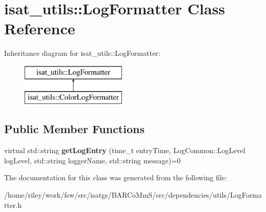 \hypertarget{classisat__utils_1_1_log_formatter}{}\section{isat\+\_\+utils\+:\+:Log\+Formatter Class Reference}
\label{classisat__utils_1_1_log_formatter}
Inheritance diagram for isat\+\_\+utils\+:\+:Log\+Formatter\+:\begin{figure}[H]
\begin{center}
\leavevmode
\includegraphics[height=2.000000cm]{classisat__utils_1_1_log_formatter}
\end{center}
\end{figure}
\subsection*{Public Member Functions}
\begin{DoxyCompactItemize}
\item 
virtual std\+::string {\bfseries get\+Log\+Entry} (time\+\_\+t entry\+Time, Log\+Common\+::\+Log\+Level log\+Level, std\+::string logger\+Name, std\+::string message)=0\hypertarget{classisat__utils_1_1_log_formatter_ae5dd8b0dc31ee35c6bd3b9c937e5106f}{}\label{classisat__utils_1_1_log_formatter_ae5dd8b0dc31ee35c6bd3b9c937e5106f}

\end{DoxyCompactItemize}


The documentation for this class was generated from the following file\+:\begin{DoxyCompactItemize}
\item 
/home/riley/work/fsw/src/isatgs/\+B\+A\+R\+Co\+Mm\+S/src/dependencies/utils/Log\+Formatter.\+h\end{DoxyCompactItemize}
